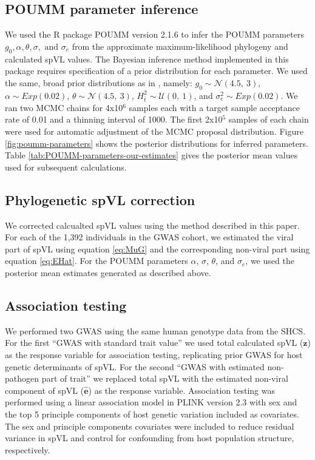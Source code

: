 \documentclass[11pt]{article}
\begin{document}
\begin{linenumbers}
\subsection*{POUMM parameter inference}

We used the R package POUMM version 2.1.6 \citep{Mitov2017a-POUMM} to infer the POUMM parameters $g_0, \alpha, \theta, \sigma, \text{ and }\sigma_e$ from the approximate maximum-likelihood phylogeny and calculated spVL values. The Bayesian inference method implemented in this package requires specification of a prior distribution for each parameter. We used the same, broad prior distributions as in \citet{Mitov2018}, namely: $g_{0} \sim \mathcal{N}(4.5,\ 3)$, $\alpha \sim Exp(0.02)$, $\theta \sim \mathcal{N}(4.5,\ 3)$, $H^2_{\bar{t}} \sim \mathcal{U}(0,\ 1)$, and $\sigma^2_e \sim Exp(0.02)$. We ran two MCMC chains for 4x10$^6$ samples each with a target sample acceptance rate of 0.01 and a thinning interval of 1000. The first 2x10$^5$ samples of each chain were used for automatic adjustment of the MCMC proposal distribution. Figure \ref{fig:poumm-parameters} shows the posterior distributions for inferred parameters. Table \ref{tab:POUMM-parameters-our-estimates} gives the posterior mean values used for subsequent calculations.

\subsection*{Phylogenetic spVL correction}
We corrected calcualted spVL values using the method described in this paper. For each of the 1,392 individuals in the GWAS cohort, we estimated the viral part of spVL using equation \ref{eq:MuG} and the corresponding non-viral part using equation \ref{eq:EHat}. For the POUMM parameters $\alpha$, $\sigma$, $\theta$, and $\sigma_e$, we used the posterior mean estimates generated as described above. 

\subsection*{Association testing}
We performed two GWAS using the same human genotype data from the SHCS. For the first ``GWAS with standard trait value'' we used total calculated spVL ($\bm{z}$) as the response variable for association testing, replicating prior GWAS for host genetic determinants of spVL. For the second ``GWAS with estimated non-pathogen part of trait'' we replaced total spVL with the estimated non-viral component of spVL ($\hat{\bm{e}}$) as the response variable. Association testing was performed using a linear association model in PLINK version 2.3 \citep{Chang2015} with sex and the top 5 principle components of host genetic variation included as covariates. The sex and principle components covariates were included to reduce residual variance in spVL and control for confounding from host population structure, respectively. 


\end{linenumbers}
\end{document}

